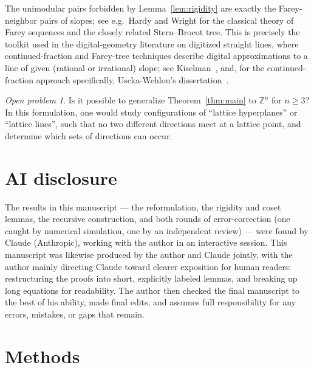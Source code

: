 \documentclass[a4paper,11pt,oneside,reqno]{amsart}
\theoremstyle{definition}
\theoremstyle{remark}
\newtheorem{openproblem}[definition]{Open problem}
\theoremstyle{plain}
\newcommand{\Z}{\mathbb{Z}}
\begin{document}
The unimodular pairs forbidden by Lemma~\ref{lem:rigidity} are exactly the Farey-neighbor pairs of
slopes; see e.g.\ Hardy and Wright \cite[Ch.~III]{HardyWright2008} for the classical theory of
Farey sequences and the closely related Stern--Brocot tree. This is precisely the toolkit used in
the digital-geometry literature on digitized straight lines, where continued-fraction and
Farey-tree techniques describe digital approximations to a line of given (rational or irrational)
slope; see Kiselman~\cite{Kiselman2022}, and, for the continued-fraction approach specifically,
Uscka-Wehlou's dissertation~\cite{UsckaWehlou2009}.

\begin{openproblem}
  Is it possible to generalize Theorem~\ref{thm:main} to \(\Z^n\) for \(n\ge3\)? In this formulation,
  one would study configurations of ``lattice hyperplanes'' or ``lattice lines'', such that no two
  different directions meet at a lattice point, and determine which sets of directions can occur.
\end{openproblem}

\section*{AI disclosure}

The results in this manuscript --- the reformulation, the rigidity and coset lemmas, the
recursive construction, and both rounds of error-correction (one caught by numerical simulation,
one by an independent review) --- were found by Claude (Anthropic), working with the author in an
interactive session. This manuscript was likewise produced by the author and Claude jointly, with
the author mainly directing Claude toward clearer exposition for human readers: restructuring the
proofs into short, explicitly labeled lemmas, and breaking up long equations for readability. The
author then checked the final manuscript to the best of his ability, made final edits, and assumes
full responsibility for any errors, mistakes, or gaps that remain.

\section*{Methods}
\end{document}
